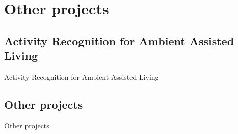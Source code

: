 
\section{Other projects}
    
  \subsection{Activity Recognition for Ambient Assisted Living}
    \begin{frame}{Activity Recognition for Ambient Assisted Living}
      
    \end{frame}
    
  \subsection{Other projects}
    \begin{frame}{Other projects}
      
    \end{frame}
    